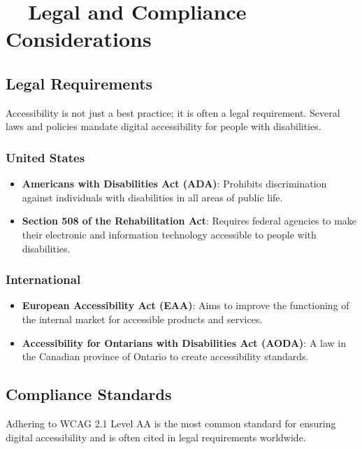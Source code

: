 \section{~~Legal and Compliance Considerations}\label{ch15:sec:legal-compliance}

\subsection{Legal Requirements}\label{ch15:ssec:legal-reqs}
Accessibility is not just a best practice; it is often a legal requirement. Several laws and policies mandate digital accessibility for people with disabilities.

\subsubsection{United States}\label{ch15:sssec:legal-us}
\begin{itemize}
	\item \textbf{Americans with Disabilities Act (ADA)}: Prohibits discrimination against individuals with disabilities in all areas of public life.
	\item \textbf{Section 508 of the Rehabilitation Act}: Requires federal agencies to make their electronic and information technology accessible to people with disabilities.
\end{itemize}

\subsubsection{International}\label{ch15:sssec:legal-intl}
\begin{itemize}
	\item \textbf{European Accessibility Act (EAA)}: Aims to improve the functioning of the internal market for accessible products and services.
	\item \textbf{Accessibility for Ontarians with Disabilities Act (AODA)}: A law in the Canadian province of Ontario to create accessibility standards.
\end{itemize}

\subsection{Compliance Standards}\label{ch15:ssec:compliance-standards}
Adhering to WCAG 2.1 Level AA is the most common standard for ensuring digital accessibility and is often cited in legal requirements worldwide.

